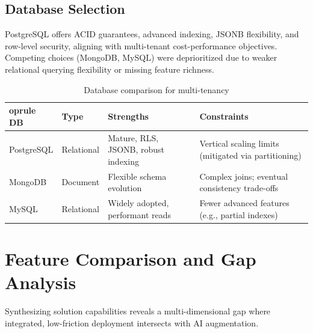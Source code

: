 \subsection{Database Selection}
PostgreSQL offers ACID guarantees, advanced indexing, JSONB flexibility, and row-level security, aligning with multi-tenant cost-performance objectives. Competing choices (MongoDB, MySQL) were deprioritized due to weaker relational querying flexibility or missing feature richness.

\begin{table}[ht]
  \caption{Database comparison for multi-tenancy}\label{tab:database}
  \centering
  \begin{tabular}{p{2.4cm}p{2.1cm}p{4.5cm}p{4.5cm}}
    	oprule
    DB & Type & Strengths & Constraints \\
    \midrule
    PostgreSQL & Relational & Mature, RLS, JSONB, robust indexing & Vertical scaling limits (mitigated via partitioning) \\
    MongoDB & Document & Flexible schema evolution & Complex joins; eventual consistency trade-offs \\
    MySQL & Relational & Widely adopted, performant reads & Fewer advanced features (e.g., partial indexes) \\
    \bottomrule
  \end{tabular}
\end{table}

\section{Feature Comparison and Gap Analysis}\label{sec:gap-analysis}
Synthesizing solution capabilities reveals a multi-dimensional gap where integrated, low-friction deployment intersects with AI augmentation.

